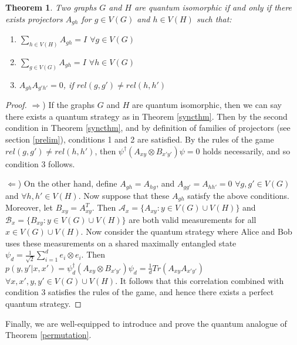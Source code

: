 \documentclass[12pt]{article}
\newtheorem{thm}{Theorem}[section]
\begin{document}
\begin{thm} \label{projqiso}
Two graphs $G$ and $H$ are quantum isomorphic if and only if there exists projectors $A_{gh}$ for $g \in V(G)$ and $h \in V(H)$ such that:
\begin{enumerate}
\item $\sum_{h \in V(H)} A_{gh} = I$  $\forall g \in V(G)$
\item $\sum_{g \in V(G)} A_{gh} = I$  $\forall h \in V(G)$
\item $A_{gh}A_{g'h'} = 0$, if $rel(g, g') \neq rel(h, h')$
\end{enumerate}
\end{thm}
\begin{proof}
$\Rightarrow$) If the graphs $G$ and $H$ are quantum isomorphic, then we can say there exists a quantum strategy as in Theorem \ref{syncthm}. Then by the second condition in Theorem \ref{syncthm}, and by definition of families of projectors (see section \ref{prelim}), conditions 1 and 2 are satisfied. By the rules of the game $rel(g, g') \neq rel(h, h')$, then $\psi^{\dag} (A_{xy} \otimes B_{x'y'}) \psi = 0$ holds necessarily, and so condition 3 follows.

$\Leftarrow$) On the other hand, define $A_{gh} = A_{hg}$, and $A_{gg'} = A_{hh'} = 0$ $\forall g, g' \in V(G)$ and $\forall h, h' \in V(H)$. Now suppose that these $A_{gh}$ satisfy the above conditions. Moreover, let $B_{xy} = A_{xy}^T$. Then $\mathcal{A}_x = \{A_{xy}: y \in V(G) \cup V(H)\}$ and $\mathcal{B}_x = \{B_{xy}: y \in V(G) \cup V(H)\}$ are both valid measurements for all $x \in V(G) \cup V(H)$. Now consider the quantum strategy where Alice and Bob uses these measurements on a shared maximally entangled state $\psi_d = \frac{1}{\sqrt{2}} \sum_{i=1}^d e_i \otimes e_i$. Then $p(y, y'|x, x') = \psi^{\dag}_d (A_{xy} \otimes B_{x'y'}) \psi_d= \frac{1}{d}Tr(A_{xy}A_{x'y'})$ $\forall x, x', y, y' \in V(G) \cup V(H)$. It follows that this correlation combined with condition 3 satisfies the rules of the game, and hence there exists a perfect quantum strategy.
\end{proof}

Finally, we are well-equipped to introduce and prove the quantum analogue of Theorem \ref{permutation}.
\end{document}
